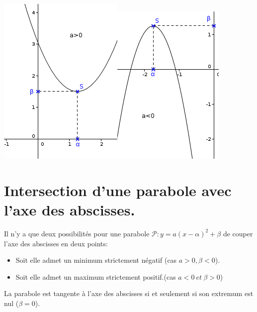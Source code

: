\documentclass[a4paper,11pt]{article}
\theoremstyle{break}
\begin{document}
      \includegraphics{variationsapos}\hspace{1cm}\includegraphics{variationsaneg}
    

     
     \section{Intersection d'une parabole avec l'axe des abscisses.}
    
    \begin{Prop}
    Il n'y a que deux possibilités pour une parabole $\mathcal{P}:y=a(x-\alpha)^2+\beta$ 
    de couper l'axe des abscisses en deux points:
   \begin{itemize}
    \item Soit elle admet un minimum strictement négatif (cas $a>0, \beta <0$).
    \item Soit elle admet un maximum strictement positif.(cas $a<0\ et\ \beta >0$)
   \end{itemize}
   
   La parabole est tangente à l'axe des abscisses si et seulement si son extremum est 
   nul ($\beta=0$).

  \end{Prop}
  
\end{document}
